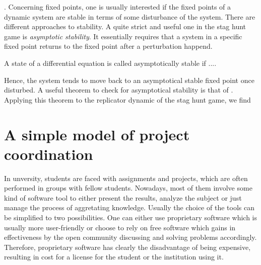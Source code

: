 \documentclass[11pt]{article}
\begin{document}
\parencite{sandholm_population_2010}.
Concerning fixed points, one is usually interested if the fixed points of 
a dynamic system are stable in terms of some disturbance of the system. 
There are different approaches to stability. A quite strict and useful one 
in the stag hunt game is \textit{asymptotic stability}. 
It essentially requires that a system in a specific fixed point returns 
to the fixed point after a perturbation happend.
\begin{mydef}
        A state of a differential equation is called asymptotically stable
        if ....
\end{mydef}
Hence, the system tends to move back to an asymptotical stable fixed point
once disturbed. 
A useful theorem to check for asymptotical stability is that 
of \cite{hartmanngrobman}. 
Applying this theorem to the replicator dynamic of the stag hunt game, we find
\section{A simple model of project coordination}
In unversity, students are faced with assignments and projects, which are 
often performed in groups with fellow students.
Nowadays, most of them involve some kind of 
software tool to either present the results, analyze the subject or just
manage the process of aggretating knowledge. Usually the choice of the tools
can be simplified to two possibilities.
One can either use proprietary software
which is usually more user-friendly or choose to rely on free software which
gains in effectiveness by the open community discussing and solving problems
accordingly. Therefore, proprietary software has clearly the disadvantage of
being expensive, resulting in cost for a license for the student or the
institution using it. 
\end{document}
